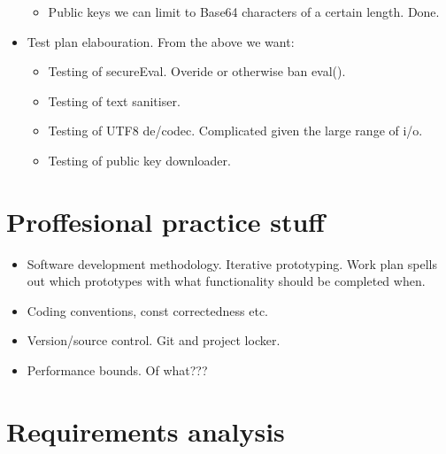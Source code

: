 \begin{itemize}
\begin{itemize}
                \item Public keys we can limit to Base64 characters of a certain length. Done.
            \end{itemize}
            \item Test plan elabouration. From the above we want:
            \begin{itemize}
                \item Testing of secureEval. Overide or otherwise ban eval().
                \item Testing of text sanitiser.
                \item Testing of UTF8 de/codec. Complicated given the large range of i/o.
                \item Testing of public key downloader.
            \end{itemize}
        \end{itemize}
    
    
\section{Proffesional practice stuff}
    \begin{itemize}
	\item Software development methodology. Iterative prototyping. Work plan spells out which prototypes with what functionality should be completed when.
        \item Coding conventions, const correctedness etc.
	\item Version/source control. Git and project locker.
	\item Performance bounds. Of what???
    \end{itemize}
    
\section{Requirements analysis}
        
